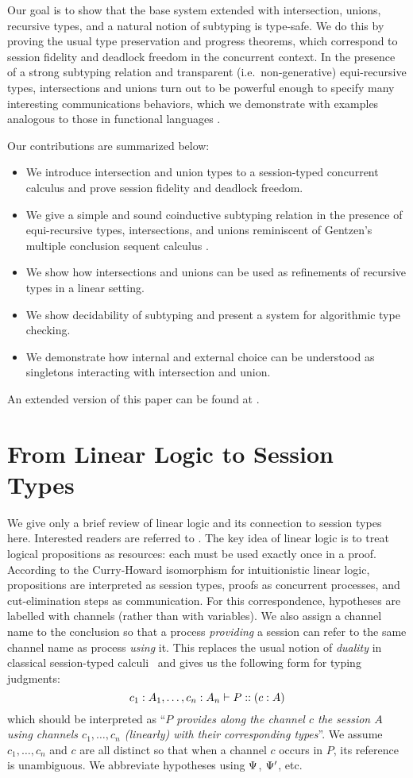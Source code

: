 \documentclass[submission,copyright,creativecommons]{eptcs}
\begin{document}
Our goal is to show that the base system extended with intersection, unions, recursive types, and a natural notion of subtyping is type-safe. We do this by proving the usual type preservation and progress theorems, which correspond to session fidelity and deadlock freedom in the concurrent context. In the presence of a strong subtyping relation and transparent (i.e.\ non-generative)  equi-recursive types, intersections and unions turn out to be powerful enough to specify many interesting communications behaviors, which we demonstrate with examples analogous to those in functional languages \cite{FreemanP91,Dunfield03}.

Our contributions are summarized below:
\begin{itemize}
  \item We introduce intersection and union types to a session-typed concurrent calculus and prove session fidelity and deadlock freedom.
  \item We give a simple and sound coinductive subtyping relation in the presence of equi-recursive types, intersections, and unions reminiscent of Gentzen's multiple conclusion sequent calculus \cite{Gentzen35, Girard87}.
  \item We show how intersections and unions can be used as refinements of recursive types in a linear setting.
  \item We show decidability of subtyping and present a system for algorithmic type checking.
  \item We demonstrate how internal and external choice can be understood as singletons interacting with intersection and union.
\end{itemize}

An extended version of this paper can be found at \cite{Acay16}.

\section{From Linear Logic to Session Types}
\label{base}
We give only a brief review of linear logic and its connection to session types here. Interested readers are referred to \cite{CairesP10, PfenningG15, Honda93}. The key idea of linear logic is to treat logical propositions as resources: each must be used exactly once in a proof. According to the Curry-Howard isomorphism for intuitionistic linear logic, propositions are interpreted as session types, proofs as concurrent processes, and cut-elimination steps as communication. For this correspondence, hypotheses are labelled with channels (rather than with variables). We also assign a channel name to the conclusion so that a process \emph{providing} a session can refer to the same channel name as process \emph{using} it. This replaces the usual notion of \emph{duality} in classical session-typed calculi~\cite{Honda93} and gives us the following form for typing judgments:
$$ c_1 : A_1, \ldots, c_n : A_n \vdash P :: (c : A)$$
which should be interpreted as ``\emph{$P$ provides along the channel $c$ the session $A$ using channels $c_1, \ldots, c_n$ (linearly) with their corresponding types}''. We assume $c_1, \ldots, c_n$ and $c$ are all distinct so that when a channel $c$ occurs in $P$, its reference is unambiguous.  We abbreviate hypotheses using $\Psi$,
$\Psi'$, etc.
\end{document}
